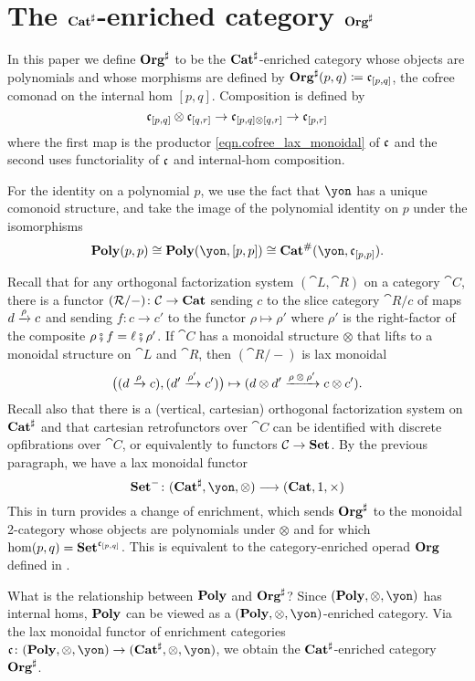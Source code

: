 \section{The $\mathbf{Cat}^\sharp$-enriched category $\mathbf{Org}^\sharp$}\label{sec.orgsharp}

In this paper we define $\mathbf{Org}^\sharp$ to be the $\mathbf{Cat}^\sharp$-enriched category whose objects are polynomials and whose morphisms are defined by $\mathbf{Org}^\sharp(p, q) \coloneqq \mathfrak{c}_{[p,q]}$, the cofree comonad on the internal hom $[p,q]$. 
Composition is defined by 
\[
    \mathfrak{c}_{[p,q]} \otimes \mathfrak{c}_{[q,r]} \to \mathfrak{c}_{[p, q] \otimes [q, r]} \to \mathfrak{c}_{[p, r]}
\]
where the first map is the productor \eqref{eqn.cofree_lax_monoidal} of $\mathfrak{c}$ and the second uses functoriality of $\mathfrak{c}$ and internal-hom composition.

For the identity on a polynomial $p$, we use the fact that $\yon$ has a unique comonoid structure, and take the image of the polynomial identity on $p$ under the isomorphisms
\[
    \poly(p, p) \iso \poly(\yon , [p, p]) \iso \smcat^\#(\yon, \cofree_{[p,p]}).
\]

Recall that for any orthogonal factorization system $(\cat{L},\cat{R})$ on a category $\cat{C}$, there is a functor $(\mathcal{R}/-)\colon\mathcal{C}\to\mathbf{Cat}$ sending $c$ to the slice category $\cat{R}/c$ of maps $d\xrightarrow[]{\textnormal{$\rho$}}c$ and sending $f\colon c\to c'$ to the functor $\rho\mapsto\rho'$ where $\rho'$ is the right-factor of the composite $\rho\mathbin{\fatsemi} f=\ell\mathbin{\fatsemi}\rho'$. If $\cat{C}$ has a monoidal structure $\otimes$ that lifts to a monoidal structure on $\cat{L}$ and $\cat{R}$, then $(\cat{R}/-)$ is lax monoidal
\[
\big((d\xrightarrow[]{\textnormal{$\rho$}}c), (d'\xrightarrow[]{\textnormal{$\rho'$}}c')\big)\mapsto (d\otimes d'\xrightarrow[]{\textnormal{$\rho\otimes\rho'$}}c\otimes c').\]
Recall also \cite[Proposition 5.52]{niu2022poly} that there is a (vertical, cartesian) orthogonal factorization system on $\mathbf{Cat}^\sharp$ and that cartesian retrofunctors over $\cat{C}$ can be identified with discrete opfibrations over $\cat{C}$, or equivalently to functors $\mathcal{C}\to\mathbf{Set}$. By the previous paragraph, we have a lax monoidal functor
\[
\smset^-\colon(\smcat^\sharp,\yon,\otimes)\too(\smcat,1,\times)
\]
This in turn provides a change of enrichment, which sends $\mathbf{Org}^\sharp$ to the monoidal 2-category whose objects are polynomials under $\otimes$ and for which $\hom(p,q)=\mathbf{Set}^{\mathfrak{c}_{[p,q]}}$. This is equivalent to the category-enriched operad $\mathbf{Org}$ defined in \cite[Definition 2.19]{spivak2021learnersv1}.

\begin{remark}
    What is the relationship between $\mathbf{Poly}$ and $\mathbf{Org}^\sharp$? Since $(\poly, \otimes, \yon)$ has internal homs, $\mathbf{Poly}$ can be viewed as a $(\poly, \otimes, \yon)$-enriched category. Via the lax monoidal functor of enrichment categories $\cofree\colon (\poly, \otimes, \yon) \to (\smcat^\sharp, \otimes, \yon)$, we obtain the $\mathbf{Cat}^\sharp$-enriched category $\mathbf{Org}^\sharp$.
\end{remark}

